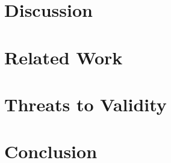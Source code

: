 \documentclass[sigconf,nonacm]{acmart}
\begin{document}
\section{Discussion}


\section{Related Work}


\section{Threats to Validity}


\section{Conclusion}




\end{document}
